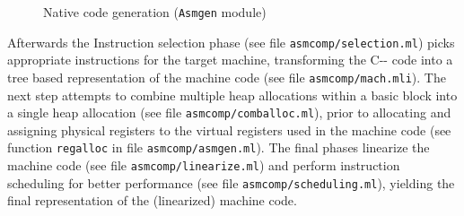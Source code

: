 \documentclass[10pt,a4paper,draft,twocolumn]{article}
\begin{document}
\begin{figure}[htb]
  \centering
  \caption{Native code generation (\texttt{Asmgen} module)}
  \label{fig:Native_code_generation}
\end{figure}

Afterwards the Instruction selection phase (see file \texttt{asmcomp/selection.ml}) picks appropriate
instructions for the target machine, transforming the C\mbox{-}\mbox{-} code into a tree based representation
of the machine code (see file \texttt{asmcomp/mach.mli}). The next step attempts to combine multiple heap
allocations within a basic block into a single heap allocation (see file \texttt{asmcomp/comballoc.ml}),
prior to allocating and assigning physical registers to the virtual registers used in the machine code
(see function \texttt{regalloc} in file \texttt{asmcomp/asmgen.ml}).
The final phases linearize the machine code (see file \texttt{asmcomp/linearize.ml}) and perform
instruction scheduling for better performance (see file \texttt{asmcomp/scheduling.ml}), yielding the
final representation of the (linearized) machine code.
\end{document}
